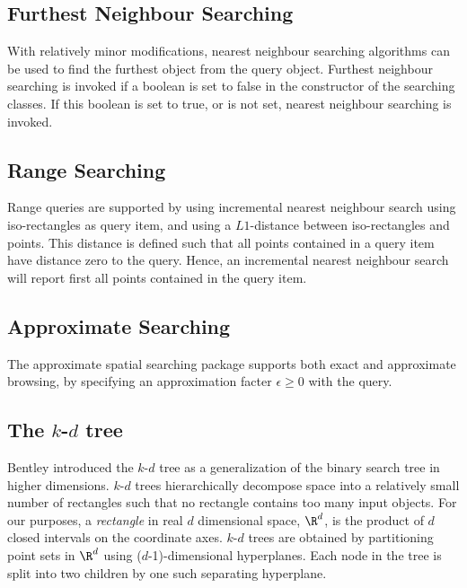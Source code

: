 \subsection{Furthest Neighbour Searching}

With relatively minor modifications, nearest neighbour searching algorithms can be
used to find the furthest object from the query object. Furthest neighbour searching is invoked if
a boolean  is set to false in the constructor of the searching classes.
If this boolean is set to true, or is not set, nearest neighbour searching is invoked.

\subsection{Range Searching}

Range queries are supported by using incremental nearest neighbour search
using iso-rectangles as query item, and using a $L1$-distance between iso-rectangles and points.
This distance is defined such that all points contained in a query item have distance zero
to the query. Hence, an incremental nearest neighbour search will report first all points
contained in the query item.  

\subsection{Approximate Searching}

The approximate spatial searching package supports both exact and approximate browsing, by
specifying an approximation facter $\epsilon \geq 0$ with the query.

\subsection{The $k$-$d$ tree}

Bentley \cite{b-mbstu-75} introduced the $k$-$d$ tree as a generalization of the binary
search tree in higher dimensions. $k$-$d$ trees hierarchically decompose space into a
relatively small number of rectangles such that no rectangle contains too many input objects.
For our purposes, a {\it rectangle} in real $d$ dimensional space, $\R^d$, is the product of $d$ closed
intervals on the coordinate axes.
$k$-$d$ trees are obtained by partitioning point sets in $\R^d$ using
($d$-1)-dimensional hyperplanes.
Each node in the tree is split into two children by one such separating hyperplane.

